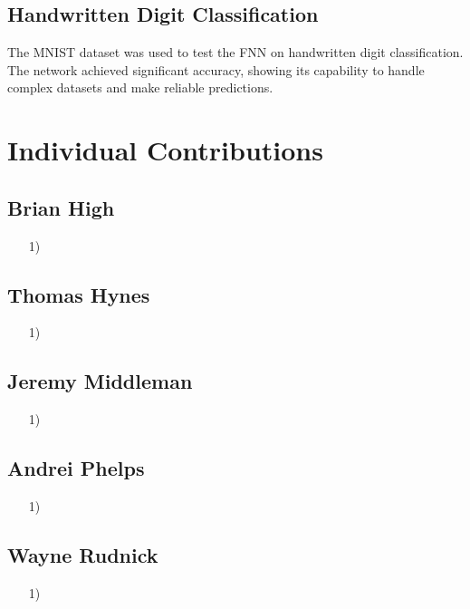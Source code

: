 \documentclass{article}
\begin{document}
\subsection{Handwritten Digit Classification}

The MNIST dataset was used to test the FNN on handwritten digit classification. The network achieved significant accuracy, showing its capability to handle complex datasets and make reliable predictions.

\section{Individual Contributions}

\subsection{Brian High}
\begin{itemize}
    \item[1)] 
\end{itemize}

\subsection{Thomas Hynes}
\begin{itemize}
    \item[1)] 
\end{itemize}

\subsection{Jeremy Middleman}
\begin{itemize}
    \item[1)] 
\end{itemize}

\subsection{Andrei Phelps}
\begin{itemize}
    \item[1)] 
\end{itemize}

\subsection{Wayne Rudnick}
\begin{itemize}
    \item[1)] 
\end{itemize}
\end{document}
